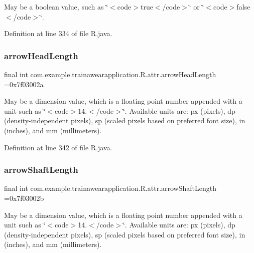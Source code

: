 May be a boolean value, such as \char`\"{}$<$code$>$true$<$/code$>$\char`\"{} or \char`\"{}$<$code$>$false$<$/code$>$\char`\"{}. 

Definition at line 334 of file R.\+java.

\mbox{\label{classcom_1_1example_1_1trainawearapplication_1_1_r_1_1attr_a02d178210d3da1cd85057dcae90a88f0}} 
\subsubsection{\texorpdfstring{arrowHeadLength}{arrowHeadLength}}
{\footnotesize\ttfamily final int com.\+example.\+trainawearapplication.\+R.\+attr.\+arrow\+Head\+Length =0x7f03002a\hspace{0.3cm}{\ttfamily [static]}}

May be a dimension value, which is a floating point number appended with a unit such as \char`\"{}$<$code$>$14.\+5sp$<$/code$>$\char`\"{}. Available units are\+: px (pixels), dp (density-\/independent pixels), sp (scaled pixels based on preferred font size), in (inches), and mm (millimeters). 

Definition at line 342 of file R.\+java.

\mbox{\label{classcom_1_1example_1_1trainawearapplication_1_1_r_1_1attr_a433c81e577de7a99c53f6e2397938ee0}} 
\subsubsection{\texorpdfstring{arrowShaftLength}{arrowShaftLength}}
{\footnotesize\ttfamily final int com.\+example.\+trainawearapplication.\+R.\+attr.\+arrow\+Shaft\+Length =0x7f03002b\hspace{0.3cm}{\ttfamily [static]}}

May be a dimension value, which is a floating point number appended with a unit such as \char`\"{}$<$code$>$14.\+5sp$<$/code$>$\char`\"{}. Available units are\+: px (pixels), dp (density-\/independent pixels), sp (scaled pixels based on preferred font size), in (inches), and mm (millimeters). 

